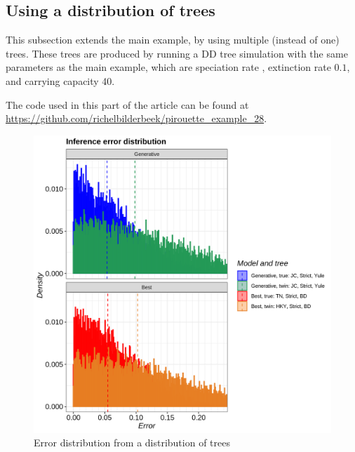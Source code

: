 



\subsection{Using a distribution of trees}
\label{subsec:distribution}


This subsection extends the main example, by using multiple (instead of
one) trees. These trees are produced by running a DD tree simulation
with the same parameters as the main example, which are
speciation rate , extinction rate $0.1$, and carrying
capacity 40. 

The code used in this part of the article can be found at 
\url{https://github.com/richelbilderbeek/pirouette_example_28}.

\begin{figure}[H]
  \includegraphics[width=\textwidth]{pirouette_example_28/example_28_314/errors.png}
  \caption{Error distribution from a distribution of trees}
\end{figure}

